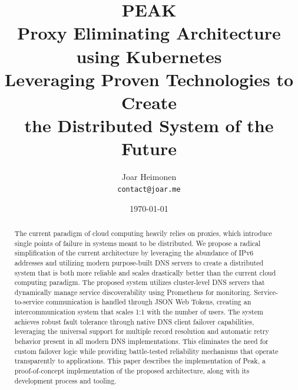 \documentclass[12pt]{article}
\author{
    Joar Heimonen\\
    \texttt{contact@joar.me}
}
\title{
    \textbf{PEAK}\\[0.5em]
    \large \textbf{P}roxy \textbf{E}liminating \textbf{A}rchitecture using \textbf{K}ubernetes\\[0.3em]
    \large Leveraging Proven Technologies to Create\\
    the Distributed System of the Future
}
\date{\today}
\begin{document}
\maketitle

\begin{abstract}
    \noindent The current paradigm of cloud computing heavily relies on proxies, which introduce single points of failure in systems meant to be distributed. 
    We propose a radical simplification of the current architecture by leveraging the abundance of IPv6 addresses and utilizing modern purpose-built 
    DNS servers to create a distributed system that is both more reliable and scales drastically better than the current cloud computing paradigm. 
    The proposed system utilizes cluster-level DNS servers that dynamically manage service discoverability using Prometheus for monitoring. 
    Service-to-service communication is handled through JSON Web Tokens, creating an intercommunication system that scales 1:1 with the number of users. 
    The system achieves robust fault tolerance through native DNS client failover capabilities, leveraging the universal support for multiple 
    record resolution and automatic retry behavior present in all modern DNS implementations. 
    This eliminates the need for custom failover logic while providing battle-tested reliability mechanisms that operate transparently to applications. 
    This paper describes the implementation of Peak, a proof-of-concept implementation of the proposed architecture, along with its development process and tooling.
\end{abstract}

\pagebreak

\tableofcontents

\pagebreak
\end{document}
